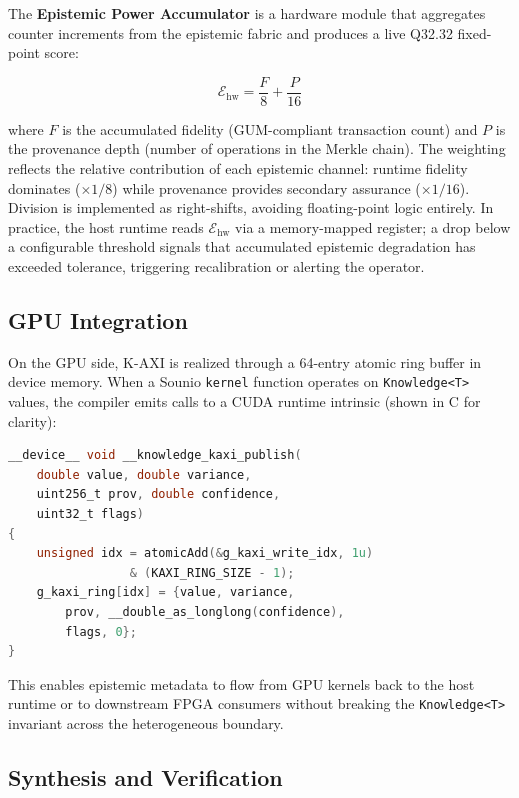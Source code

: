 \documentclass[journal]{IEEEtran}
\begin{document}
The \textbf{Epistemic Power Accumulator} is a hardware module that
aggregates counter increments from the epistemic fabric and produces a
live Q32.32 fixed-point score:

\begin{equation}
  \mathcal{E}_{\text{hw}} = \frac{F}{8} + \frac{P}{16}
  \label{eq:epistemic-power}
\end{equation}

\noindent where $F$ is the accumulated fidelity (GUM-compliant transaction
count) and $P$ is the provenance depth (number of operations in the
Merkle chain). The weighting reflects the relative contribution of each
epistemic channel: runtime fidelity dominates ($\times 1/8$) while
provenance provides secondary assurance ($\times 1/16$).
Division is implemented as right-shifts, avoiding floating-point logic
entirely. In practice, the host runtime reads $\mathcal{E}_{\text{hw}}$
via a memory-mapped register; a drop below a configurable threshold
signals that accumulated epistemic degradation has exceeded tolerance,
triggering recalibration or alerting the operator.

\subsection{GPU Integration}

On the GPU side, K-AXI is realized through a 64-entry atomic ring buffer
in device memory. When a Sounio \texttt{kernel} function operates on
\texttt{Knowledge<T>} values, the compiler emits calls to a CUDA runtime
intrinsic (shown in C for clarity):

\begin{lstlisting}[caption={GPU-side K-AXI publish (compiler-emitted CUDA runtime intrinsic, not user-written Sounio code)},language=C]
__device__ void __knowledge_kaxi_publish(
    double value, double variance,
    uint256_t prov, double confidence,
    uint32_t flags)
{
    unsigned idx = atomicAdd(&g_kaxi_write_idx, 1u)
                 & (KAXI_RING_SIZE - 1);
    g_kaxi_ring[idx] = {value, variance,
        prov, __double_as_longlong(confidence),
        flags, 0};
}
\end{lstlisting}

This enables epistemic metadata to flow from GPU kernels back to the
host runtime or to downstream FPGA consumers without breaking the
\texttt{Knowledge<T>} invariant across the heterogeneous boundary.

\subsection{Synthesis and Verification}
\end{document}
